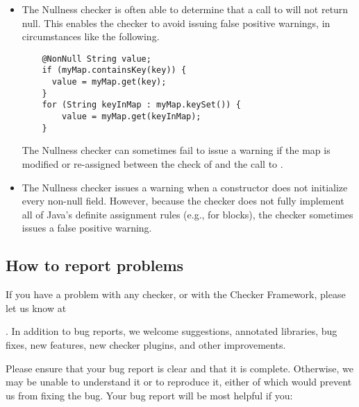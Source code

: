 \begin{itemize}
\item
  The Nullness checker is often able to determine that a call to
   will not return null.  This enables the checker to avoid
  issuing false positive warnings, in circumstances like the following.

\begin{Verbatim}
    @NonNull String value;
    if (myMap.containsKey(key)) {
      value = myMap.get(key);
    }
    for (String keyInMap : myMap.keySet()) {
        value = myMap.get(keyInMap);
    }
\end{Verbatim}

  The Nullness checker can sometimes fail to issue a warning if the map is
  modified or re-assigned between the check of  and the
  call to .



\item 
  The Nullness checker issues a warning when a constructor does not
  initialize every non-null field.  However, because the checker does not
  fully implement all of Java's definite assignment rules (e.g., for
   blocks), the checker sometimes issues a false positive
  warning.

\end{itemize}



\subsection{How to report problems\label{reporting-bugs}}

If you have a problem with any checker, or with the Checker Framework,
please let us know at
\begin{smaller}
%
\end{smaller}%
.  In addition
to bug reports, we welcome suggestions, annotated libraries, bug fixes, new
features, new checker plugins, and other improvements.

Please ensure that your bug report is clear and that it is complete.
Otherwise, we may be unable to understand it or to reproduce it, either of
which would prevent us from fixing the bug.  Your bug report will be most
helpful if you:

